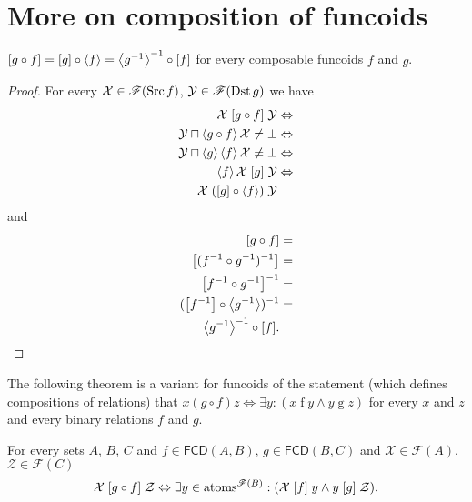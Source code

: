 \section{More on composition of funcoids}
\begin{prop}
\label{comp-fcd-r}$\mathord{\mathrel{\left[g\circ f\right]}}=\mathord{\mathrel{\left[g\right]}}\circ\left\langle f\right\rangle=\left\langle g^{-1}\right\rangle^{-1}\circ\mathord{\mathrel{\left[f\right]}}$
for every composable funcoids $f$ and $g$.\end{prop}
\begin{proof}
For every $\mathcal{X}\in\mathscr{F}(\operatorname{Src} f)$, $\mathcal{Y}\in\mathscr{F}(\operatorname{Dst}
g)$
we have
\begin{align*}
\mathcal{X}\mathrel{\left[g\circ f\right]}\mathcal{Y} & \Leftrightarrow\\
\mathcal{Y}\sqcap\left\langle g\circ f\right\rangle\mathcal{X}\ne\bot &
\Leftrightarrow\\
\mathcal{Y}\sqcap\left\langle g\right\rangle\left\langle f\right\rangle\mathcal{X}\ne\bot &
\Leftrightarrow\\
\left\langle f\right\rangle\mathcal{X}\mathrel{\left[g\right]}\mathcal{Y} & \Leftrightarrow\\
\mathcal{X}\mathrel{(\mathord{\mathrel{\left[g\right]}}\circ\left\langle f\right\rangle)}\mathcal{Y}
\end{align*}
and
\begin{align*}
\mathord{\mathrel{\left[g\circ f\right]}} & =\\
\mathord{\mathrel{\left[(f^{-1}\circ g^{-1})^{-1}\right]}} & =\\
\mathord{\mathrel{\left[f^{-1}\circ g^{-1}\right]}}^{-1} & =\\
(\mathord{\mathrel{\left[f^{-1}\right]}}\circ\left\langle g^{-1}\right\rangle)^{-1} & =\\
\left\langle g^{-1}\right\rangle^{-1}\circ\mathord{\mathrel{\left[f\right]}}.
\end{align*}

\end{proof}
The following theorem is a variant for funcoids of the statement (which
defines compositions of relations) that $x\mathrel{(g\circ
f)}z\Leftrightarrow\exists y:(x\mathrel fy\land y\mathrel gz)$
for every $x$ and $z$ and every binary relations $f$ and $g$.
\begin{thm}
\label{fcd-atom-middle}For every sets $A$, $B$, $C$ and $f\in\mathsf{FCD}(A,B)$,
$g\in\mathsf{FCD}(B,C)$ and $\mathcal{X}\in\mathscr{F}(A)$,
$\mathcal{Z}\in\mathscr{F}(C)$
\[
\mathcal{X}\mathrel{\left[g\circ f\right]}\mathcal{Z}\Leftrightarrow\exists
y\in\operatorname{atoms}^{\mathscr{F}(B)}:(\mathcal{X}\mathrel{\left[f\right]}y\land y\mathrel{\left[g\right]}\mathcal{Z}).
\]
\end{thm}
